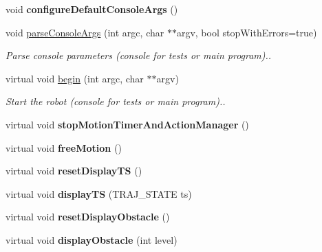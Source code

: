 \begin{DoxyCompactItemize}
\mbox{\label{classRobot_a3817e59aa5c6ee337847a04eebd6b0c7}} 
void {\bfseries configure\+Default\+Console\+Args} ()
\item 
\mbox{\label{classRobot_a3a26291a86ba55cd33e173e70bf5ce5d}} 
void \hyperlink{classRobot_a3a26291a86ba55cd33e173e70bf5ce5d}{parse\+Console\+Args} (int argc, char $\ast$$\ast$argv, bool stop\+With\+Errors=true)
\begin{DoxyCompactList}\small\item\em Parse console parameters (console for tests or main program).. \end{DoxyCompactList}\item 
\mbox{\label{classRobot_ae8cede2564e5b9229da095991c064ae4}} 
virtual void \hyperlink{classRobot_ae8cede2564e5b9229da095991c064ae4}{begin} (int argc, char $\ast$$\ast$argv)
\begin{DoxyCompactList}\small\item\em Start the robot (console for tests or main program).. \end{DoxyCompactList}\item 
\mbox{\label{classRobot_a46c797e9dba7c96927fa881851309bf0}} 
virtual void {\bfseries stop\+Motion\+Timer\+And\+Action\+Manager} ()
\item 
\mbox{\label{classRobot_ac7a09e8aad44c834c60d55ed96d25d7f}} 
virtual void {\bfseries free\+Motion} ()
\item 
\mbox{\label{classRobot_a460232bc7b2485ccd6bf3006566da322}} 
virtual void {\bfseries reset\+Display\+TS} ()
\item 
\mbox{\label{classRobot_a7fbd102d7898ba33eecae47cfec530fa}} 
virtual void {\bfseries display\+TS} (T\+R\+A\+J\+\_\+\+S\+T\+A\+TE ts)
\item 
\mbox{\label{classRobot_afcfbfb8298b846a516f749c0bd087610}} 
virtual void {\bfseries reset\+Display\+Obstacle} ()
\item 
\mbox{\label{classRobot_a91607f9ec65e768636015e1e9ed71b3f}} 
virtual void {\bfseries display\+Obstacle} (int level)
\end{DoxyCompactItemize}
